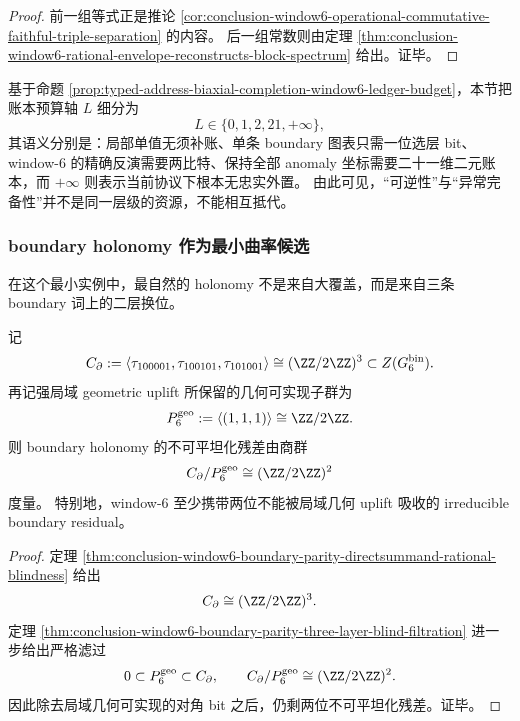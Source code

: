 \begin{proof}
前一组等式正是推论 \ref{cor:conclusion-window6-operational-commutative-faithful-triple-separation} 的内容。
后一组常数则由定理 \ref{thm:conclusion-window6-rational-envelope-reconstructs-block-spectrum} 给出。证毕。
\end{proof}

基于命题 \ref{prop:typed-address-biaxial-completion-window6-ledger-budget}，本节把账本预算轴 \(L\) 细分为
\[
L\in\{0,1,2,21,+\infty\},
\]
其语义分别是：局部单值无须补账、单条 boundary 图表只需一位选层 bit、window-\(6\) 的精确反演需要两比特、保持全部 anomaly 坐标需要二十一维二元账本，而 \(+\infty\) 则表示当前协议下根本无忠实外置。
由此可见，“可逆性”与“异常完备性”并不是同一层级的资源，不能相互抵代。

\subsubsection{boundary holonomy 作为最小曲率候选}\label{subsubsec:typed-address-biaxial-completion-window6-boundary-holonomy}
在这个最小实例中，最自然的 holonomy 不是来自大覆盖，而是来自三条 boundary 词上的二层换位。

\begin{proposition}\label{prop:typed-address-biaxial-completion-window6-boundary-holonomy}
记
\[
C_{\partial}
:=
\langle \tau_{100001},\tau_{100101},\tau_{101001}\rangle
\cong
(\ZZ/2\ZZ)^3
\subset Z(G_6^{\mathrm{bin}}).
\]
再记强局域 geometric uplift 所保留的几何可实现子群为
\[
P_6^{\mathrm{geo}}
:=
\langle (1,1,1)\rangle
\cong
\ZZ/2\ZZ.
\]
则 boundary holonomy 的不可平坦化残差由商群
\[
C_{\partial}/P_6^{\mathrm{geo}}
\cong
(\ZZ/2\ZZ)^2
\]
度量。
特别地，window-\(6\) 至少携带两位不能被局域几何 uplift 吸收的 irreducible boundary residual。
\end{proposition}

\begin{proof}
定理 \ref{thm:conclusion-window6-boundary-parity-directsummand-rational-blindness} 给出
\[
C_{\partial}\cong (\ZZ/2\ZZ)^3.
\]
定理 \ref{thm:conclusion-window6-boundary-parity-three-layer-blind-filtration} 进一步给出严格滤过
\[
0\subset P_6^{\mathrm{geo}}\subset C_{\partial},
\qquad
C_{\partial}/P_6^{\mathrm{geo}}\cong (\ZZ/2\ZZ)^2.
\]
因此除去局域几何可实现的对角 bit 之后，仍剩两位不可平坦化残差。证毕。
\end{proof}

